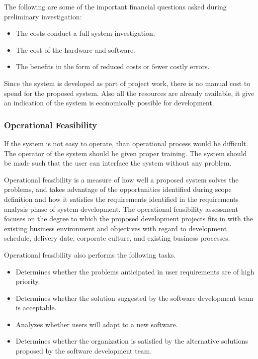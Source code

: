 The following are some of the important financial questions asked during preliminary investigation:
\begin{itemize}
	\item The costs conduct a full system investigation.
	\item The cost of the hardware and software.
	\item The benefits in the form of reduced costs or fewer costly errors.
\end{itemize}

Since the system is developed as part of project work, there is no manual cost to spend for the proposed system. Also all the resources are already available, it give an indication of the system is economically possible for development.

\subsubsection{Operational Feasibility}
If the system is not easy to operate, than operational process would be difficult. The operator of the system should be given proper training. The system should be made such that the user can interface the system without any problem.

Operational feasibility is a measure of how well a proposed system solves the problems, and takes advantage of the opportunities identified during scope definition and how it satisfies the requirements identified in the requirements analysis phase of system development. The operational feasibility assessment focuses on the degree to which the proposed development projects fits in with the existing business environment and objectives with regard to development schedule, delivery date, corporate culture, and existing business processes.

Operational feasibility also performs the following tasks.

\begin{itemize}
	\item Determines whether the problems anticipated in user requirements are of high priority.
	\item Determines whether the solution suggested by the software development team is acceptable.
	\item Analyzes whether users will adapt to a new software.
	\item Determines whether the organization is satisfied by the alternative solutions proposed by the software development team.
\end{itemize}

